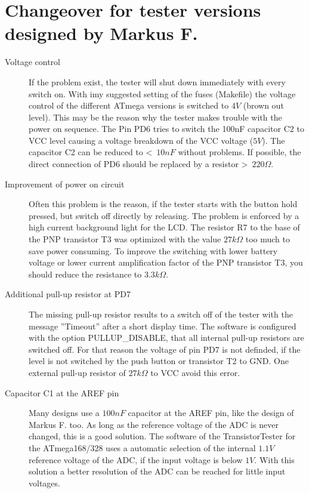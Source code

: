 \section{Changeover for tester versions designed by Markus F.}
\label{sec:change_markus}
\begin{description}

\item[Voltage control]
If the problem exist, the tester will shut down immediately with every switch on.
With imy suggested setting of the fuses (Makefile) the voltage control of the different
ATmega versions is switched to \(4V\) (brown out level).
This may be the reason why the tester makes trouble with the power on sequence.
The Pin PD6 tries to switch the 100nF capacitor C2 to VCC level causing a voltage
breakdown of the VCC voltage (\(5V\)).
The capacitor C2 can be reduced to \textless~\(10nF\) without problems.
If possible, the direct connection of PD6 should be replaced by a resistor \textgreater~\(220\Omega\).
\item[Improvement of power on circuit]
Often this problem is the reason, if the tester starts with the button hold pressed, but switch off
directly by releasing. The problem is enforced by a high current background light for the LCD.
The resistor R7 to the base of the PNP transistor T3 was optimized with the value \(27k\Omega\) 
too much to save power consuming.
To improve the switching with lower battery voltage or lower current amplification factor of
the PNP transistor T3, you should reduce the resistance to \(3.3k\Omega\).
\item[Additional pull-up resistor at PD7]
The missing pull-up resistor results to a switch off of the tester with the message ''Timeout''
after a short display time.
The software is configured with the option PULLUP\_DISABLE, that all internal pull-up
resistors are switched off. For that reason the voltage of pin PD7 is not definded,
if the level is not switched by the push button or transistor T2 to GND.
One external pull-up resistor of \(27k\Omega\) to VCC avoid this error.
\item[Capacitor C1 at the AREF pin]
Many designs use a \(100nF\) capacitor at the AREF pin, like the design of Markus F. too.
As long as the reference voltage of the ADC is never changed, this is a good solution.
The software of the TransistorTester for the ATmega168/328 uses a automatic selection
of the internal \(1.1V\) reference voltage of the ADC, if the input voltage is below \(1V\).
With this solution a better resolution of the ADC can be reached for little input voltages.

\end{description}
